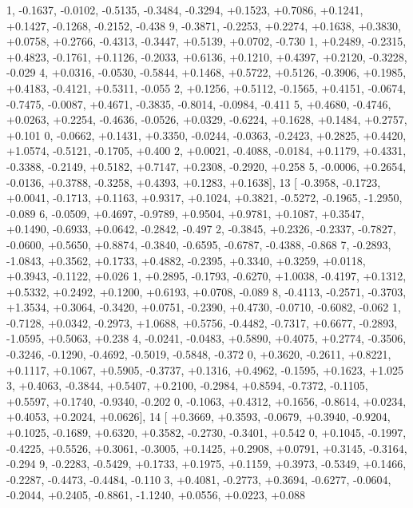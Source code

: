 \begin{DoxyCode}
      1, -0.1637, -0.0102, -0.5135, -0.3484, -0.3294, +0.1523, +0.7086, +0.1241, +0.1427, -0.1268, -0.2152, -0.438
      9, -0.3871, -0.2253, +0.2274, +0.1638, +0.3830, +0.0758, +0.2766, -0.4313, -0.3447, +0.5139, +0.0702, -0.730
      1, +0.2489, -0.2315, +0.4823, -0.1761, +0.1126, -0.2033, +0.6136, +0.1210, +0.4397, +0.2120, -0.3228, -0.029
      4, +0.0316, -0.0530, -0.5844, +0.1468, +0.5722, +0.5126, -0.3906, +0.1985, +0.4183, -0.4121, +0.5311, -0.055
      2, +0.1256, +0.5112, -0.1565, +0.4151, -0.0674, -0.7475, -0.0087, +0.4671, -0.3835, -0.8014, -0.0984, -0.411
      5, +0.4680, -0.4746, +0.0263, +0.2254, -0.4636, -0.0526, +0.0329, -0.6224, +0.1628, +0.1484, +0.2757, +0.101
      0, -0.0662, +0.1431, +0.3350, -0.0244, -0.0363, -0.2423, +0.2825, +0.4420, +1.0574, -0.5121, -0.1705, +0.400
      2, +0.0021, -0.4088, -0.0184, +0.1179, +0.4331, -0.3388, -0.2149, +0.5182, +0.7147, +0.2308, -0.2920, +0.258
      5, -0.0006, +0.2654, -0.0136, +0.3788, -0.3258, +0.4393, +0.1283, +0.1638],
13 [ -0.3958, -0.1723, +0.0041, -0.1713, +0.1163, +0.9317, +0.1024, +0.3821, -0.5272, -0.1965, -1.2950, -0.089
      6, -0.0509, +0.4697, -0.9789, +0.9504, +0.9781, +0.1087, +0.3547, +0.1490, -0.6933, +0.0642, -0.2842, -0.497
      2, -0.3845, +0.2326, -0.2337, -0.7827, -0.0600, +0.5650, +0.8874, -0.3840, -0.6595, -0.6787, -0.4388, -0.868
      7, -0.2893, -1.0843, +0.3562, +0.1733, +0.4882, -0.2395, +0.3340, +0.3259, +0.0118, +0.3943, -0.1122, +0.026
      1, +0.2895, -0.1793, -0.6270, +1.0038, -0.4197, +0.1312, +0.5332, +0.2492, +0.1200, +0.6193, +0.0708, -0.089
      8, -0.4113, -0.2571, -0.3703, +1.3534, +0.3064, -0.3420, +0.0751, -0.2390, +0.4730, -0.0710, -0.6082, -0.062
      1, -0.7128, +0.0342, -0.2973, +1.0688, +0.5756, -0.4482, -0.7317, +0.6677, -0.2893, -1.0595, +0.5063, +0.238
      4, -0.0241, -0.0483, +0.5890, +0.4075, +0.2774, -0.3506, -0.3246, -0.1290, -0.4692, -0.5019, -0.5848, -0.372
      0, +0.3620, -0.2611, +0.8221, +0.1117, +0.1067, +0.5905, -0.3737, +0.1316, +0.4962, -0.1595, +0.1623, +1.025
      3, +0.4063, -0.3844, +0.5407, +0.2100, -0.2984, +0.8594, -0.7372, -0.1105, +0.5597, +0.1740, -0.9340, -0.202
      0, -0.1063, +0.4312, +0.1656, -0.8614, +0.0234, +0.4053, +0.2024, +0.0626],
14 [ +0.3669, +0.3593, -0.0679, +0.3940, -0.9204, +0.1025, -0.1689, +0.6320, +0.3582, -0.2730, -0.3401, +0.542
      0, +0.1045, -0.1997, -0.4225, +0.5526, +0.3061, -0.3005, +0.1425, +0.2908, +0.0791, +0.3145, -0.3164, -0.294
      9, -0.2283, -0.5429, +0.1733, +0.1975, +0.1159, +0.3973, -0.5349, +0.1466, -0.2287, -0.4473, -0.4484, -0.110
      3, +0.4081, -0.2773, +0.3694, -0.6277, -0.0604, -0.2044, +0.2405, -0.8861, -1.1240, +0.0556, +0.0223, +0.088

\end{DoxyCode}
